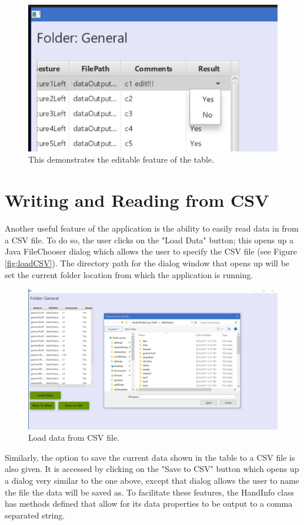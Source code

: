 \begin{figure}[H]
\centering
\includegraphics[scale=0.45]{Figures/6_tableEditingInProgress.JPG}
\caption[Editing Table Entries]{This demonstrates the editable feature of the table.}
\label{fig:tableEdit}
\end{figure}

\section{Writing and Reading from CSV}
Another useful feature of the application is the ability to easily read data in from a CSV file. To do so, the user clicks on the "Load Data" button; this opens up a Java FileChooser dialog which allows the user to specify the CSV file (see Figure \ref{fig:loadCSV}). The directory path for the dialog window that opens up will be set the current folder location from which the application is running.  
\begin{figure}[H]
\centering
\includegraphics[scale=0.25]{Figures/6_loadDataButton.JPG}
\caption[Load Data From CSV]{Load data from CSV file.}
\label{fig:tableEdit}
\end{figure}
Similarly, the option to save the current data shown in the table to a CSV file is also given. It is accessed by clicking on the "Save to CSV" button which opens up a dialog very similar to the one above, except that dialog allows the  user to name the file the data will be saved as. To facilitate these features, the HandInfo class has methods defined that allow for its data properties to be output to a comma separated string. 


